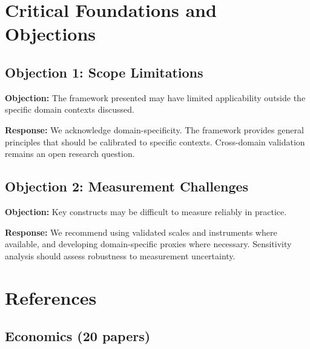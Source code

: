 \section{Critical Foundations and Objections}
\label{sec:dfn-foundations}

\subsection{Objection 1: Scope Limitations}

\textbf{Objection:} The framework presented may have limited applicability
outside the specific domain contexts discussed.

\textbf{Response:} We acknowledge domain-specificity. The framework provides
general principles that should be calibrated to specific contexts. Cross-domain
validation remains an open research question.

\subsection{Objection 2: Measurement Challenges}

\textbf{Objection:} Key constructs may be difficult to measure reliably in
practice.

\textbf{Response:} We recommend using validated scales and instruments where
available, and developing domain-specific proxies where necessary. Sensitivity
analysis should assess robustness to measurement uncertainty.


\section{References}

\nocite{bcm_master}

\label{sec:references-domain}

\subsection{Economics (20 papers)}

